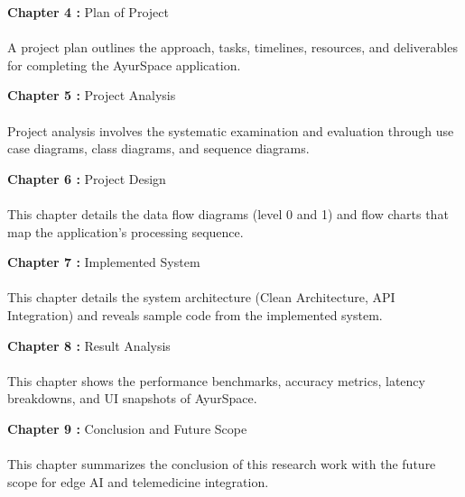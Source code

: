 \item {\textbf{Chapter 4 : }} Plan of Project\\\\
A project plan outlines the approach, tasks, timelines, resources, and deliverables for completing the AyurSpace application.

\item {\textbf{Chapter 5 : }} Project Analysis\\\\
Project analysis involves the systematic examination and evaluation through use case diagrams, class diagrams, and sequence diagrams.

 \item {\textbf{Chapter 6 : }} Project Design\\\\
This chapter details the data flow diagrams (level 0 and 1) and flow charts that map the application's processing sequence.

\item {\textbf{Chapter 7 : }} Implemented System\\\\
This chapter details the system architecture (Clean Architecture, API Integration) and reveals sample code from the implemented system.

\item {\textbf{Chapter 8 : }} Result Analysis\\\\
This chapter shows the performance benchmarks, accuracy metrics, latency breakdowns, and UI snapshots of AyurSpace.

\item {\textbf{Chapter 9 : }} Conclusion and Future Scope\\\\
This chapter summarizes the conclusion of this research work with the future scope for edge AI and telemedicine integration.
